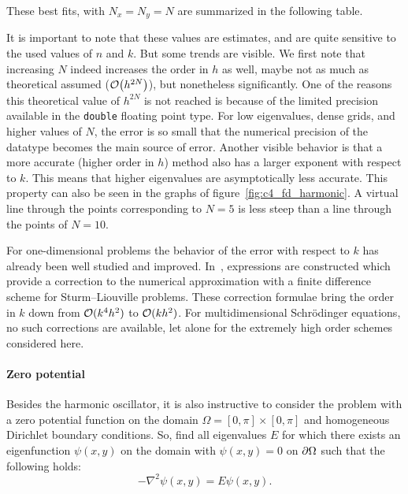 These best fits, with $N_x = N_y = N$ are summarized in the following table.
\begin{center}
    
\end{center}

It is important to note that these values are estimates, and are quite sensitive to the used values of $n$ and $k$. But some trends are visible. We first note that increasing $N$ indeed increases the order in $h$ as well, maybe not as much as theoretical assumed ($\OO\mleft(h^{2N}\mright)$), but nonetheless significantly. One of the reasons this theoretical value of $h^{2N}$ is not reached is because of the limited precision available in the \texttt{double} floating point type. For low eigenvalues, dense grids, and higher values of $N$, the error is so small that the numerical precision of the datatype becomes the main source of error. Another visible behavior is that a more accurate (higher order in $h$) method also has a larger exponent with respect to $k$. This means that higher eigenvalues are asymptotically less accurate. This property can also be seen in the graphs of figure~\ref{fig:c4_fd_harmonic}. A virtual line through the points corresponding to $N = 5$ is less steep than a line through the points of $N = 10$.

For one-dimensional problems the behavior of the error with respect to $k$ has already been well studied and improved. In~\cite{paine_correction_1981}, expressions are constructed which provide a correction to the numerical approximation with a finite difference scheme for Sturm--Liouville problems. These correction formulae bring the order in $k$ down from $\operatorname{\mathcal{O}}(k^4h^2)$ to $\operatorname{\mathcal{O}}(k h^2)$. For multidimensional Schrödinger equations, no such corrections are available, let alone for the extremely high order schemes considered here.

\paragraph{Zero potential} Besides the harmonic oscillator, it is also instructive to consider the problem with a zero potential function on the domain $\Omega = [0, \pi] \times [0, \pi]$ and homogeneous Dirichlet boundary conditions. So, find all eigenvalues $E$ for which there exists an eigenfunction $\psi(x, y)$ on the domain with $\psi(x, y) = 0$ on $\partial\Omega$ such that the following holds:
\begin{equation}\label{equ:c4_fd_zero}
    -\nabla^2 \psi(x, y) = E \psi(x, y) \text{.}
\end{equation}

